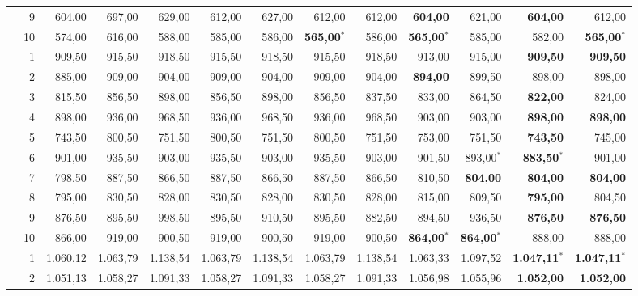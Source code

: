 \documentclass[11pt,a4paper]{article}
\begin{document}
\begin{table}[!htbp]
{\begin{tabular}{rrr rr rr rr rr rr}
 & 9 & 604{,}00 & 697{,}00 & 629{,}00 & 612{,}00 & 627{,}00 & 612{,}00 & 612{,}00 & \textbf{604{,}00} & 621{,}00 & \textbf{604{,}00} & 612{,}00 \\
 & 10 & 574{,}00 & 616{,}00 & 588{,}00 & 585{,}00 & 586{,}00 & \textbf{565{,}00}$^{*}$ & 586{,}00 & \textbf{565{,}00}$^{*}$ & 585{,}00 & 582{,}00 & \textbf{565{,}00}$^{*}$ \\
\addlinespace
40 & 1 & 909{,}50 & 915{,}50 & 918{,}50 & 915{,}50 & 918{,}50 & 915{,}50 & 918{,}50 & 913{,}00 & 915{,}00 & \textbf{909{,}50} & \textbf{909{,}50} \\
 & 2 & 885{,}00 & 909{,}00 & 904{,}00 & 909{,}00 & 904{,}00 & 909{,}00 & 904{,}00 & \textbf{894{,}00} & 899{,}50 & 898{,}00 & 898{,}00 \\
 & 3 & 815{,}50 & 856{,}50 & 898{,}00 & 856{,}50 & 898{,}00 & 856{,}50 & 837{,}50 & 833{,}00 & 864{,}50 & \textbf{822{,}00} & 824{,}00 \\
 & 4 & 898{,}00 & 936{,}00 & 968{,}50 & 936{,}00 & 968{,}50 & 936{,}00 & 968{,}50 & 903{,}00 & 903{,}00 & \textbf{898{,}00} & \textbf{898{,}00} \\
 & 5 & 743{,}50 & 800{,}50 & 751{,}50 & 800{,}50 & 751{,}50 & 800{,}50 & 751{,}50 & 753{,}00 & 751{,}50 & \textbf{743{,}50} & 745{,}00 \\
 & 6 & 901{,}00 & 935{,}50 & 903{,}00 & 935{,}50 & 903{,}00 & 935{,}50 & 903{,}00 & 901{,}50 & 893{,}00$^{*}$ & \textbf{883{,}50}$^{*}$ & 901{,}00 \\
 & 7 & 798{,}50 & 887{,}50 & 866{,}50 & 887{,}50 & 866{,}50 & 887{,}50 & 866{,}50 & 810{,}50 & \textbf{804{,}00} & \textbf{804{,}00} & \textbf{804{,}00} \\
 & 8 & 795{,}00 & 830{,}50 & 828{,}00 & 830{,}50 & 828{,}00 & 830{,}50 & 828{,}00 & 815{,}00 & 809{,}50 & \textbf{795{,}00} & 804{,}50 \\
 & 9 & 876{,}50 & 895{,}50 & 998{,}50 & 895{,}50 & 910{,}50 & 895{,}50 & 882{,}50 & 894{,}50 & 936{,}50 & \textbf{876{,}50} & \textbf{876{,}50} \\
 & 10 & 866{,}00 & 919{,}00 & 900{,}50 & 919{,}00 & 900{,}50 & 919{,}00 & 900{,}50 & \textbf{864{,}00}$^{*}$ & \textbf{864{,}00}$^{*}$ & 888{,}00 & 888{,}00 \\
\addlinespace
60 & 1 & 1.060{,}12 & 1.063{,}79 & 1.138{,}54 & 1.063{,}79 & 1.138{,}54 & 1.063{,}79 & 1.138{,}54 & 1.063{,}33 & 1.097{,}52 & \textbf{1.047{,}11}$^{*}$ & \textbf{1.047{,}11}$^{*}$ \\
 & 2 & 1.051{,}13 & 1.058{,}27 & 1.091{,}33 & 1.058{,}27 & 1.091{,}33 & 1.058{,}27 & 1.091{,}33 & 1.056{,}98 & 1.055{,}96 & \textbf{1.052{,}00} & \textbf{1.052{,}00} \\

\end{tabular}}
\end{table}
\end{document}
